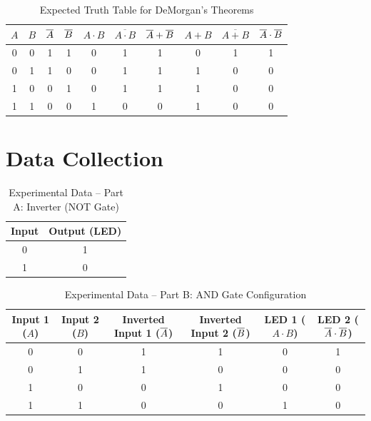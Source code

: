 \begin{table}[H]
	\centering
	\caption{Expected Truth Table for DeMorgan's Theorems}\label{tab:theory10}
	\small
	\setlength{\tabcolsep}{5pt}
	\begin{tabular}{@{}cccc|ccc|ccc@{}}
		\toprule
		$A$ & $B$ & $\overline{A}$ & $\overline{B}$ & $A\cdot B$ & $\overline{A\cdot B}$ & $\overline{A}+\overline{B}$ & $A+B$ & $\overline{A+B}$ & $\overline{A}\cdot\overline{B}$ \\
		\midrule
		0 & 0 & 1 & 1 & 0 & 1 & 1 & 0 & 1 & 1 \\
		0 & 1 & 1 & 0 & 0 & 1 & 1 & 1 & 0 & 0 \\
		1 & 0 & 0 & 1 & 0 & 1 & 1 & 1 & 0 & 0 \\
		1 & 1 & 0 & 0 & 1 & 0 & 0 & 1 & 0 & 0 \\
		\bottomrule
	\end{tabular}
\end{table}

\section{Data Collection}
\label{sec:datacollection10}

\begin{table}[H]
	\centering
	\caption{Experimental Data -- Part A: Inverter (NOT Gate)}\label{tab:partA10}
	\small
	\begin{tabular}{@{}cc@{}}
		\toprule
		Input & Output (LED) \\
		\midrule
		0 & 1 \\
		1 & 0 \\
		\bottomrule
	\end{tabular}
\end{table}

\begin{table}[H]
	\centering
	\caption{Experimental Data -- Part B: AND Gate Configuration}\label{tab:partB10}
	\small
	\begin{tabular}{@{}cccccc@{}}
		\toprule
		Input 1 ($A$) & Input 2 ($B$) & Inverted Input 1 ($\overline{A}$) & Inverted Input 2 ($\overline{B}$) & LED 1 ($A\cdot B$) & LED 2 ($\overline{A}\cdot\overline{B}$) \\
		\midrule
		0 & 0 & 1 & 1 & 0 & 1 \\
		0 & 1 & 1 & 0 & 0 & 0 \\
		1 & 0 & 0 & 1 & 0 & 0 \\
		1 & 1 & 0 & 0 & 1 & 0 \\
		\bottomrule
	\end{tabular}
\end{table}

